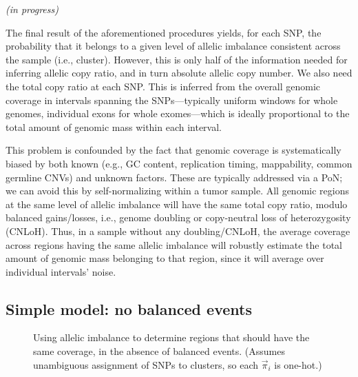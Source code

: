 \documentclass[10pt,letter]{article}
\numberwithin{equation}{section}
\begin{document}
\textit{(in progress)}

The final result of the aforementioned procedures yields, for each SNP, the probability that it belongs to a given level of allelic imbalance consistent across the sample (i.e., cluster). However, this is only half of the information needed for inferring allelic copy ratio, and in turn absolute allelic copy number. We also need the total copy ratio at each SNP. This is inferred from the overall genomic coverage in intervals spanning the SNPs---typically uniform windows for whole genomes, individual exons for whole exomes---which is ideally proportional to the total amount of genomic mass within each interval.

This problem is confounded by the fact that genomic coverage is systematically biased by both known (e.g., GC content, replication timing, mappability, common germline CNVs) and unknown factors. These are typically addressed via a PoN; 
we can avoid this by self-normalizing within a tumor sample. All genomic regions at the same level of allelic imbalance will have the same total copy ratio, modulo balanced gains/losses, i.e., genome doubling or copy-neutral loss of heterozygosity (CNLoH). Thus, in a sample without any doubling/CNLoH, the average coverage across regions having the same allelic imbalance will robustly estimate the total amount of genomic mass belonging to that region, since it will average over individual intervals' noise.

\subsection{Simple model: no balanced events}

\begin{figure}
\centering
\caption{Using allelic imbalance to determine regions that should have the same coverage, in the absence of balanced events. (Assumes unambiguous assignment of SNPs to clusters, so each $\vec\pi_i$ is one-hot.)}
\label{NormFig}
\end{figure}
\end{document}
